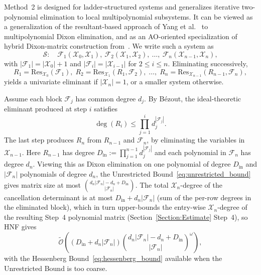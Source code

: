 Method~2 is designed for ladder-structured systems and generalizes iterative two-polynomial elimination to local multipolynomial subsystems. It can be viewed as a generalization of the resultant-based approach of Yang et al.~\cite{DBLP:conf/asiacrypt/YangZYLT24} to multipolynomial Dixon elimination, and as an AO-oriented specialization of hybrid Dixon-matrix construction from~\cite{DengQiTangDuan2022}. We write such a system as
\begin{equation}
\mathcal{S}: \quad \mathcal{F}_1(\mathcal{X}_0,\mathcal{X}_1),\ \mathcal{F}_2(\mathcal{X}_1,\mathcal{X}_2),\ \ldots,\ \mathcal{F}_n(\mathcal{X}_{n-1},\mathcal{X}_n),
\label{eq:iterative_chain}
\end{equation}
with $|\mathcal{F}_1|=|\mathcal{X}_0|+1$ and $|\mathcal{F}_i|=|\mathcal{X}_{i-1}|$ for $2\le i\le n$. Eliminating successively,
\begin{equation}
R_1 = \mathrm{Res}_{\mathcal{X}_0}(\mathcal{F}_1),\;
R_2 = \mathrm{Res}_{\mathcal{X}_1}(R_1,\mathcal{F}_2),\;\ldots,\;
R_n = \mathrm{Res}_{\mathcal{X}_{n-1}}(R_{n-1},\mathcal{F}_n),
\label{eq:iterative_resultants}
\end{equation}
yields a univariate eliminant if $|\mathcal{X}_n|=1$, or a smaller system otherwise.

Assume each block $\mathcal{F}_j$ has common degree $d_j$. By B\'ezout, the ideal-theoretic eliminant produced at step $i$ satisfies
\begin{equation}
\deg(R_i)\le \prod_{j=1}^{i} d_j^{|\mathcal{F}_j|}.
\label{eq:iterative_degree_bound}
\end{equation}
The last step produces $R_n$ from $R_{n-1}$ and $\mathcal{F}_n$, by eliminating the variables in $\mathcal{X}_{n-1}$. Here $R_{n-1}$ has degree $D_{\mathrm{in}}:=\prod_{j=1}^{n-1} d_j^{|\mathcal{F}_j|}$ and each polynomial in $\mathcal{F}_n$ has degree $d_n$. Viewing this as Dixon elimination on one polynomial of degree $D_{\mathrm{in}}$ and $|\mathcal{F}_n|$ polynomials of degree $d_n$, the Unrestricted Bound~\eqref{eq:unrestricted_bound} gives matrix size at most $\binom{d_n|\mathcal{F}_n|-d_n+D_{\mathrm{in}}}{|\mathcal{F}_n|}$. The total $\mathcal{X}_n$-degree of the cancellation determinant is at most $D_{\mathrm{in}}+d_n|\mathcal{F}_n|$ (sum of the per-row degrees in the eliminated block), which in turn upper-bounds the entry-wise $\mathcal{X}_n$-degree of the resulting Step~4 polynomial matrix (Section~\ref{Section:Estimate} Step~4), so HNF gives
\begin{equation}
\widetilde{\mathcal{O}}\!\left((D_{\mathrm{in}}+d_n|\mathcal{F}_n|)\binom{d_n|\mathcal{F}_n|-d_n+D_{\mathrm{in}}}{|\mathcal{F}_n|}^{\omega}\right),
\label{eq:iterative_sequential_complexity}
\end{equation}
with the Hessenberg Bound~\eqref{eq:hessenberg_bound} available when the Unrestricted Bound is too coarse.

